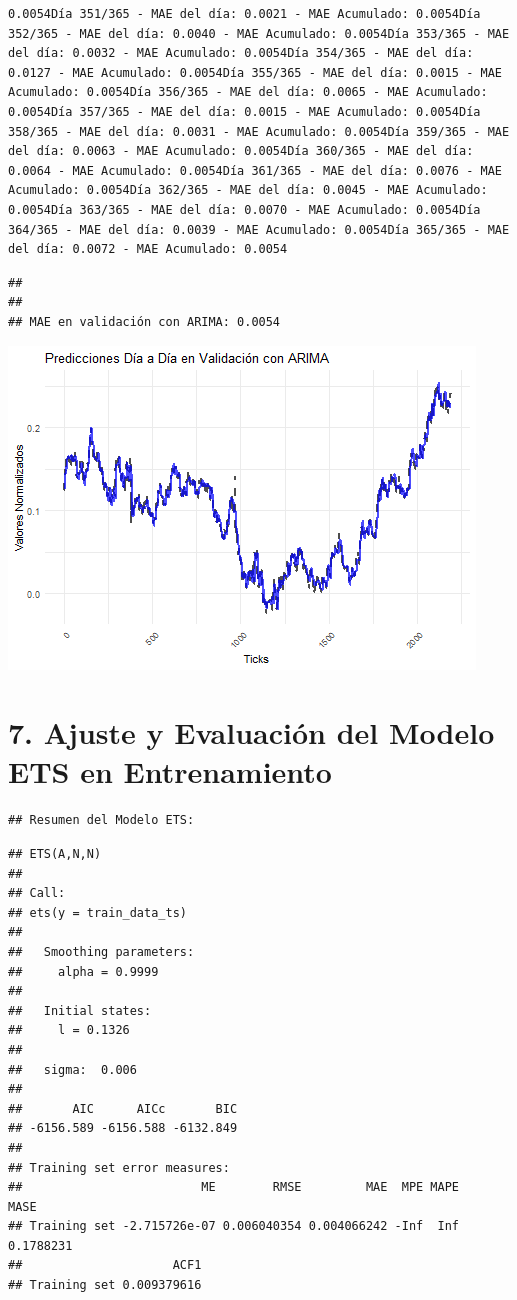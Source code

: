\documentclass[
]{book}
\begin{document}
\begin{verbatim}
0.0054Día 351/365 - MAE del día: 0.0021 - MAE Acumulado: 0.0054Día 352/365 - MAE del día: 0.0040 - MAE Acumulado: 0.0054Día 353/365 - MAE del día: 0.0032 - MAE Acumulado: 0.0054Día 354/365 - MAE del día: 0.0127 - MAE Acumulado: 0.0054Día 355/365 - MAE del día: 0.0015 - MAE Acumulado: 0.0054Día 356/365 - MAE del día: 0.0065 - MAE Acumulado: 0.0054Día 357/365 - MAE del día: 0.0015 - MAE Acumulado: 0.0054Día 358/365 - MAE del día: 0.0031 - MAE Acumulado: 0.0054Día 359/365 - MAE del día: 0.0063 - MAE Acumulado: 0.0054Día 360/365 - MAE del día: 0.0064 - MAE Acumulado: 0.0054Día 361/365 - MAE del día: 0.0076 - MAE Acumulado: 0.0054Día 362/365 - MAE del día: 0.0045 - MAE Acumulado: 0.0054Día 363/365 - MAE del día: 0.0070 - MAE Acumulado: 0.0054Día 364/365 - MAE del día: 0.0039 - MAE Acumulado: 0.0054Día 365/365 - MAE del día: 0.0072 - MAE Acumulado: 0.0054
\end{verbatim}

\begin{verbatim}
## 
## 
## MAE en validación con ARIMA: 0.0054
\end{verbatim}

\includegraphics{bookdown_time_series_files/figure-latex/unnamed-chunk-16-1.png}

\section{7. Ajuste y Evaluación del Modelo ETS en Entrenamiento}\label{ajuste-y-evaluaciuxf3n-del-modelo-ets-en-entrenamiento}

\begin{verbatim}
## Resumen del Modelo ETS:
\end{verbatim}

\begin{verbatim}
## ETS(A,N,N) 
## 
## Call:
## ets(y = train_data_ts)
## 
##   Smoothing parameters:
##     alpha = 0.9999 
## 
##   Initial states:
##     l = 0.1326 
## 
##   sigma:  0.006
## 
##       AIC      AICc       BIC 
## -6156.589 -6156.588 -6132.849 
## 
## Training set error measures:
##                         ME        RMSE         MAE  MPE MAPE      MASE
## Training set -2.715726e-07 0.006040354 0.004066242 -Inf  Inf 0.1788231
##                     ACF1
## Training set 0.009379616
\end{verbatim}
\end{document}
